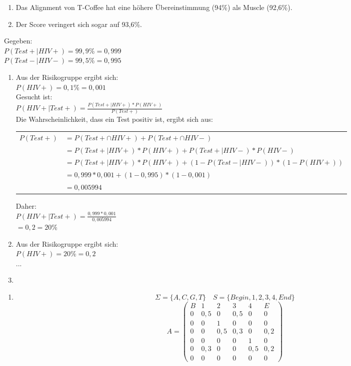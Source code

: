 \documentclass{homework}
\begin{document}
\begin{enumerate}
\begin{enumerate}
\item
Das Alignment von T-Coffee hat eine höhere Übereinstimmung (94\%) als Muscle (92,6\%).

\item
Der Score veringert sich sogar auf 93,6\%.
\end{enumerate}



Gegeben:\\
$P(Test+ | HIV+) = 99,9$\%$ = 0,999$\\
$P(Test- | HIV-) = 99,5$\%$ = 0,995$\\
\begin{enumerate}
\item 
Aus der Risikogruppe ergibt sich:\\
$P(HIV+) = 0,1$\%$ = 0,001$\\
Gesucht ist:\\
$P(HIV+ | Test+) = \frac{P(Test+ | HIV+) * P(HIV+)}{P(Test+)}$\\
Die Wahrscheinlichkeit, dass ein Test positiv ist, ergibt sich aus:\\
\begin{tabular}{l l}
$P(Test+)$ & $= P(Test+ \cap HIV+) + P(Test+ \cap HIV-)$ \\ 
 & $= P(Test+ | HIV+) * P(HIV+) + P(Test+ | HIV-) * P(HIV-)$ \\ 
 & $= P(Test+ | HIV+) * P(HIV+) + (1-P(Test- | HIV-)) * (1-P(HIV+))$\\
 & $= 0,999 * 0,001 + (1-0,995)*(1-0,001)$\\
 & $= 0,005994$\\
\end{tabular} 
Daher: \\
	$P(HIV+ | Test+) = \frac{0,999*0,001}{0,005994}$\\
	$ = 0,2 = 20$\% 
\item
Aus der Risikogruppe ergibt sich:\\
$P(HIV+) = 20$\%$ = 0,2$\\
...
\item
	
\end{enumerate}


\begin{enumerate}
\item $$\Sigma = \{A, C, G, T\} \quad S = \{Begin, 1, 2, 3, 4, End\}$$
$$A = \begin{pmatrix}
B	& 1		& 2		& 3		& 4		& E\\
0	& 0,5	& 0		& 0,5	& 0		& 0\\
0	& 0		& 1		& 0		& 0		& 0\\
0	& 0		& 0,5	& 0,3	& 0		& 0,2\\
0	& 0		& 0		& 0		& 1		& 0\\
0	& 0,3	& 0		& 0		& 0,5	& 0,2\\
0	& 0		& 0		& 0		& 0		& 0
\end{pmatrix}$$


\end{enumerate}
\end{enumerate}
\end{document}
